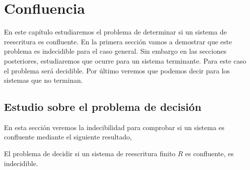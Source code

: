 \chapter{Confluencia}

En este capítulo estudiaremos el problema de determinar si un sistema
de reescritura es confluente. En la primera sección vamos a demostrar
que este problema es indecidible para el caso general. Sin embargo en
las secciones posteriores, estudiaremos que ocurre para un sistema
terminante. Para este caso el problema será decidible. Por último
veremos que podemos decir para los sistemas que no terminan.

\section{Estudio sobre el problema de decisión}
  
En esta sección veremos la indecibilidad para comprobar si un sistema
es confluente mediante el siguiente resultado,

\begin{teor}
  El problema de decidir si un sistema de reescritura finito $R$ es
  confluente, es indecidible.
\end{teor}


